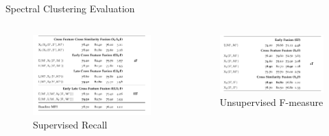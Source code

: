 \documentclass[10pt,xcolor=table]{beamer}
\begin{document}
\begin{frame}{Spectral Clustering Evaluation}
\begin{columns}
	\begin{minipage}[c][0.5\textheight][c]{\linewidth}
	\begin{figure}
		\centering
		\includegraphics[width=1\linewidth]{image2/Chapitre4/wsd_SC_SR}
		\caption{Supervised Recall}
	\end{figure}

	\end{minipage}
	\begin{minipage}[c][0.5\textheight][c]{\linewidth}
	\begin{figure}
		\centering
		\includegraphics[width=1\linewidth]{image2/Chapitre4/wsd_SC_UF.png}
		\caption{Unsupervised F-measure}
	\end{figure}
	\end{minipage}
	\end{columns}
\end{frame}
\end{document}
